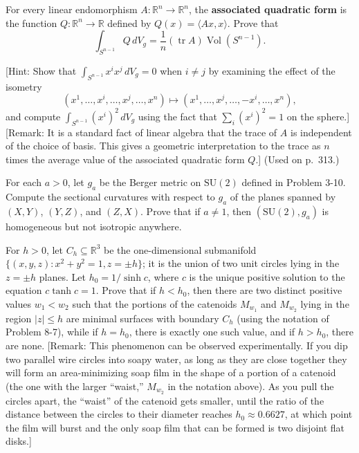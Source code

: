 \begin{exercise}
\label{prob:associated-quadratic-form}

For every linear endomorphism $A : \mathbb{R}^n \to \mathbb{R}^n$, the \textbf{associated quadratic form} is the function $Q : \mathbb{R}^n \to \mathbb{R}$ defined by $Q(x) = \langle Ax, x \rangle$. Prove that
\[
\int_{S^{n-1}} Q \, dV_g = \frac{1}{n}(\operatorname{tr} A)\operatorname{Vol}(S^{n-1}).
\]

[Hint: Show that $\int_{S^{n-1}} x^i x^j \, dV_g = 0$ when $i \ne j$ by examining the effect of the isometry
\[
(x^1, \ldots, x^i, \ldots, x^j, \ldots, x^n) \mapsto (x^1, \ldots, x^j, \ldots, -x^i, \ldots, x^n),
\]
and compute $\int_{S^{n-1}} (x^i)^2 \, dV_g$ using the fact that $\sum_i (x^i)^2 = 1$ on the sphere.] [Remark: It is a standard fact of linear algebra that the trace of $A$ is independent of the choice of basis. This gives a geometric interpretation to the trace as $n$ times the average value of the associated quadratic form $Q$.]
(Used on p.\ 313.)
\end{exercise}

\begin{exercise}
\label{prob:berger-metric-su2}
For each $a > 0$, let $g_a$ be the Berger metric on $\text{SU}(2)$ defined in Problem 3-10. Compute the sectional curvatures with respect to $g_a$ of the planes spanned by $(X, Y)$, $(Y, Z)$, and $(Z, X)$. Prove that if $a \neq 1$, then $(\text{SU}(2), g_a)$ is homogeneous but not isotropic anywhere.
\end{exercise}

\begin{exercise}
\label{prob:catenoid-boundary-minimal}
For $h > 0$, let $C_h \subseteq \mathbb{R}^3$ be the one-dimensional submanifold $\{(x, y, z) : x^2 + y^2 = 1, z = \pm h\}$; it is the union of two unit circles lying in the $z = \pm h$ planes. Let $h_0 = 1/\sinh c$, where $c$ is the unique positive solution to the equation $c \tanh c = 1$. Prove that if $h < h_0$, then there are two distinct positive values $w_1 < w_2$ such that the portions of the catenoids $M_{w_1}$ and $M_{w_2}$ lying in the region $|z| \leq h$ are minimal surfaces with boundary $C_h$ (using the notation of Problem 8-7), while if $h = h_0$, there is exactly one such value, and if $h > h_0$, there are none. [Remark: This phenomenon can be observed experimentally. If you dip two parallel wire circles into soapy water, as long as they are close together they will form an area-minimizing soap film in the shape of a portion of a catenoid (the one with the larger ``waist,'' $M_{w_2}$ in the notation above). As you pull the circles apart, the ``waist'' of the catenoid gets smaller, until the ratio of the distance between the circles to their diameter reaches $h_0 \approx 0.6627$, at which point the film will burst and the only soap film that can be formed is two disjoint flat disks.]
\end{exercise}

